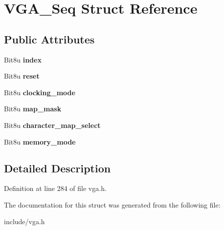 \hypertarget{structVGA__Seq}{\section{V\-G\-A\-\_\-\-Seq Struct Reference}
\label{structVGA__Seq}
}
\subsection*{Public Attributes}
\begin{DoxyCompactItemize}
\item 
\hypertarget{structVGA__Seq_a00643c92e5873dcf83d17a3135b2d693}{Bit8u {\bfseries index}}\label{structVGA__Seq_a00643c92e5873dcf83d17a3135b2d693}

\item 
\hypertarget{structVGA__Seq_a3425fe4beaea31df04abd4a6b4dc34ce}{Bit8u {\bfseries reset}}\label{structVGA__Seq_a3425fe4beaea31df04abd4a6b4dc34ce}

\item 
\hypertarget{structVGA__Seq_a86024bda4c152b6e0bee83581155233e}{Bit8u {\bfseries clocking\-\_\-mode}}\label{structVGA__Seq_a86024bda4c152b6e0bee83581155233e}

\item 
\hypertarget{structVGA__Seq_a318a641c4a0ca18dd7de0de41e475bdc}{Bit8u {\bfseries map\-\_\-mask}}\label{structVGA__Seq_a318a641c4a0ca18dd7de0de41e475bdc}

\item 
\hypertarget{structVGA__Seq_a259ad5c028390b8e3f2247913c493044}{Bit8u {\bfseries character\-\_\-map\-\_\-select}}\label{structVGA__Seq_a259ad5c028390b8e3f2247913c493044}

\item 
\hypertarget{structVGA__Seq_a73f957b3431c728ff5908dfb58ed1e75}{Bit8u {\bfseries memory\-\_\-mode}}\label{structVGA__Seq_a73f957b3431c728ff5908dfb58ed1e75}

\end{DoxyCompactItemize}


\subsection{Detailed Description}


Definition at line 284 of file vga.\-h.



The documentation for this struct was generated from the following file\-:\begin{DoxyCompactItemize}
\item 
include/vga.\-h\end{DoxyCompactItemize}
